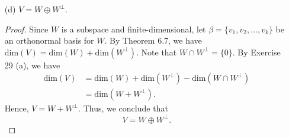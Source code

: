 \begin{enumerate}
\begin{proof}
        \[   W = (W^{\perp})^{\perp}.  \]
        \end{proof}
    \item[(d)] \( V = W \oplus W^{\perp} \).
        \begin{proof}
        Since \( W  \) is a subspace and finite-dimensional, let \( \beta = \{ {v}_{1}, {v}_{2}, \dots, {v}_{k} \}  \) be an orthonormal basis for \( W \). By Theorem 6.7, we have \( \text{dim}(V) = \text{dim}(W) + \text{dim}(W^{\perp}) \). Note that \(W \cap W^{\perp} = \{ 0 \}  \). By Exercise 29 (a), we have  
        \begin{align*}
            \text{dim}(V) &= \text{dim}(W) + \text{dim}(W^{\perp}) - \text{dim}(W \cap W^{\perp}) \\
                          &= \text{dim}(W + W^{\perp}).
        \end{align*}
        Hence, \( V = W + W^{\perp} \). Thus, we conclude that
        \[  V = W \oplus W^{\perp}. \]
        \end{proof}
\end{enumerate}

